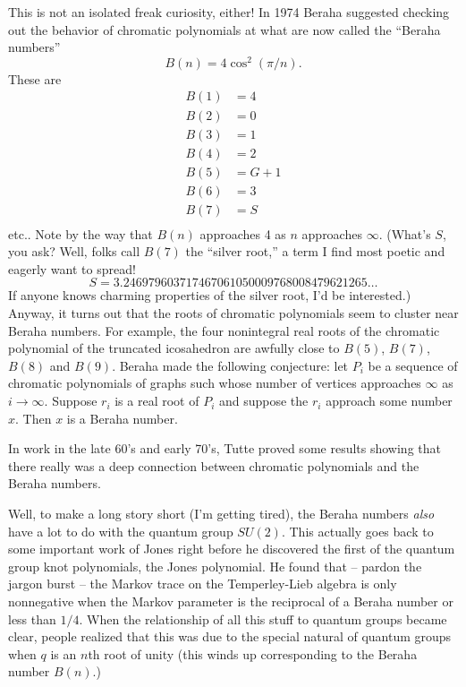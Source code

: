\documentclass{article}
\begin{document}
This is not an isolated freak curiosity, either! In 1974 Beraha
suggested checking out the behavior of chromatic polynomials at what are
now called the ``Beraha numbers'' \[B(n) = 4 \cos^2(\pi/n).\] These are
\[\begin{aligned}B(1) &= 4 \\ B(2) &= 0 \\ B(3) &= 1 \\ B(4) &= 2 \\ B(5) &= G+1 \\ B(6) &= 3 \\ B(7) &= S \\ \end{aligned}\]
etc.. Note by the way that \(B(n)\) approaches 4 as \(n\) approaches
\(\infty\). (What's \(S\), you ask? Well, folks call \(B(7)\) the
``silver root,'' a term I find most poetic and eagerly want to spread!
\[S =  3.246979603717467061050009768008479621265\ldots\] If anyone knows
charming properties of the silver root, I'd be interested.) Anyway, it
turns out that the roots of chromatic polynomials seem to cluster near
Beraha numbers. For example, the four nonintegral real roots of the
chromatic polynomial of the truncated icosahedron are awfully close to
\(B(5)\), \(B(7)\), \(B(8)\) and \(B(9)\). Beraha made the following
conjecture: let \(P_i\) be a sequence of chromatic polynomials of graphs
such whose number of vertices approaches \(\infty\) as \(i\to\infty\).
Suppose \(r_i\) is a real root of \(P_i\) and suppose the \(r_i\)
approach some number \(x\). Then \(x\) is a Beraha number.

In work in the late 60's and early 70's, Tutte proved some results
showing that there really was a deep connection between chromatic
polynomials and the Beraha numbers.

Well, to make a long story short (I'm getting tired), the Beraha numbers
\emph{also} have a lot to do with the quantum group \(SU(2)\). This
actually goes back to some important work of Jones right before he
discovered the first of the quantum group knot polynomials, the Jones
polynomial. He found that -- pardon the jargon burst -- the Markov trace
on the Temperley-Lieb algebra is only nonnegative when the Markov
parameter is the reciprocal of a Beraha number or less than \(1/4\).
When the relationship of all this stuff to quantum groups became clear,
people realized that this was due to the special natural of quantum
groups when \(q\) is an \(n\)th root of unity (this winds up
corresponding to the Beraha number \(B(n)\).)
\end{document}
